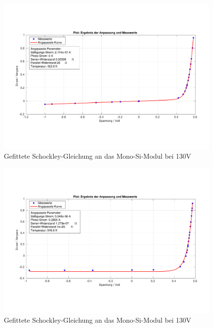 \begin{figure}[ht]
    \centering
    \includegraphics[width = \linewidth]{Bilder/SiMonoDunkelPlot.pdf}
    \caption{Gefittete Schockley-Gleichung an das Mono-Si-Modul bei 130V}
\end{figure}
\begin{figure}[ht]
    \centering
    \includegraphics[width = \linewidth]{Bilder/SiMulti130Plot.pdf}
    \caption{Gefittete Schockley-Gleichung an das Mono-Si-Modul bei 130V}
\end{figure}
